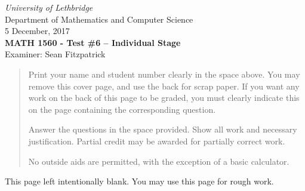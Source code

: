 \documentclass[12pt]{article}
\newcommand{\skipline}{\vspace{12pt}}
\begin{document}
\author{Instructor: Sean Fitzpatrick}
\thispagestyle{plain}
\begin{center}
\emph{University of Lethbridge}\\
Department of Mathematics and Computer Science\\
5 December, 2017\\
{\bf MATH 1560 - Test \#6 -- Individual Stage}\\
Examiner: Sean Fitzpatrick
\end{center}



\vspace{0.1in}

\vspace*{\fill}

\begin{quote}
Print your name and student number clearly in the space above. You may remove this cover page, and use the back for scrap paper. If you want any work on the back of this page to be graded, you must clearly indicate this on the page containing the corresponding question.

\medskip

Answer the questions in the space provided. Show all work and necessary justification. Partial credit may be awarded for partially correct work.
 
\medskip

No outside aids are permitted, with the exception of a basic calculator. 
\end{quote}



\newpage

This page left intentionally blank. You may use this page for rough work.
\newpage
\end{document}
